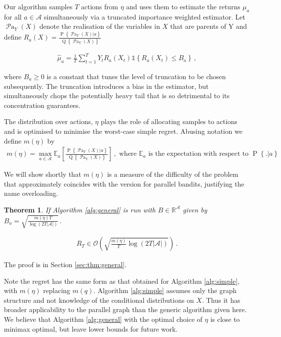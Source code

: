 \documentclass[11pt,a4paper,oneside]{book}
\newcommand{\simpleregret}{R_T}
\newcommand{\Q}[1]{\operatorname{Q}\left\{#1\right\}}
\newcommand{\EE}{\mathbb E}
\newcommand{\EEa}{\EE_a}
\newcommand{\Pn}[2]{\operatorname{P}\left\{#2|#1\right\}}
\newcommand{\calA}{\mathcal A}
\newcommand{\R}{\mathbb R}
\newcommand{\set}[1]{\left\{#1\right\}}
\newcommand{\ind}[1]{\mathds{1}\!\!\set{#1}}
\newcommand{\eq}[1]{\begin{align*}#1\end{align*}}
\newcommand{\bigo}[1]{\mathcal{O}\left( #1 \right)}
\newcommand{\parents}[1]{\operatorname{\mathcal{P}a}_{#1}}
\theoremstyle{plain}
\newtheorem{theorem}{Theorem}
\theoremstyle{definition}
\begin{document}
Our algorithm samples $T$ actions from $\eta$ and uses them to estimate the returns $\mu_a$ for all $a \in \calA$ simultaneously via a truncated importance weighted estimator. Let $\parents{Y}(X)$ denote the realisation of the variables in $X$ that are parents of Y and define $R_a(X) = \frac{\Pn{a}{\parents{Y}(X)}}{\Q{\parents{Y}(X)}}$

\eq {
\hat \mu_a =  \frac{1}{T} \sum_{t=1}^T Y_t R_a(X_t)  \ind{R_a(X_t) \leq B_a}\,, 
} 

where $ B_a \geq 0$  is a constant that tunes the level of truncation to be chosen subsequently. The truncation introduces a bias in the estimator, but simultaneously chops the potentially heavy tail that is so detrimental to its concentration guarantees. 

The distribution over actions, $\eta$ plays the role of allocating samples to actions and is optimised to minimise the worst-case simple regret. Abusing notation we define $m(\eta)$ by
\eq{
m(\eta) = \max_{a \in \calA} \EEa\left[\frac{\Pn{a}{\parents{Y}(X)}}{\Q{\parents{Y}(X)}}\right]\,,\text{ where } \EEa \text{ is the expectation with respect to } \Pn{a}.
}

We will show shortly that $m(\eta)$ is a measure of the difficulty of the problem that approximately coincides with the version for parallel bandits, justifying the name overloading.

\begin{theorem}\label{thm:general}
If Algorithm \ref{alg:general} is run with $B \in \R^{\calA}$ given by $B_a = \sqrt{\frac{m(\eta)T}{\log\left(2T|\calA|\right)}}\,.$

\eq{
\simpleregret \in \bigo{\sqrt{\frac{m(\eta)}{T} \log\left(2T|\calA|\right)}}\,.
}
\end{theorem}

The proof is in Section \ref{sec:thm:general}.

Note the regret has the same form as that obtained for Algorithm \ref{alg:simple}, with $m(\eta)$ replacing $m(q)$. Algorithm \ref{alg:simple} assumes only the graph structure and not knowledge of the conditional distributions on $X$. Thus it has broader applicability to the parallel graph than the generic algorithm given here. We believe that Algorithm \ref{alg:general} with the optimal choice of $\eta$ is close to minimax optimal, but leave lower bounds
for future work.
\end{document}
